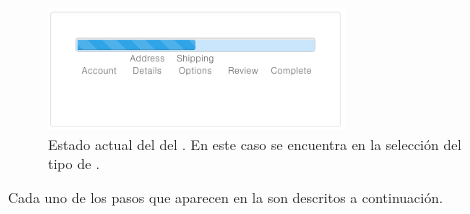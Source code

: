 	\begin{figure}[H]
		\centering
		\includegraphics[width=0.7\textwidth]{figuras/checkout/global_status.png}
		\caption{Estado actual del \workflowCPT del \shippingEF. En este caso se encuentra en la selección del tipo de  \shippingEF.}
		\label{figure:checkout:global_status}
	\end{figure}

	Cada uno de los pasos que aparecen en la  son descritos a continuación.

	

	

	

	

	